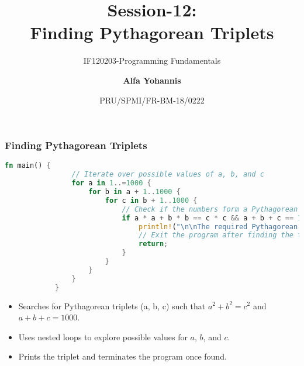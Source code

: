 \documentclass[aspectratio=169, table]{beamer}
\subtitle{IF120203-Programming Fundamentals}
\title{Session-12:\\\LARGE{Finding Pythagorean Triplets}}
\date[Serial]{\scriptsize {PRU/SPMI/FR-BM-18/0222}}
\author[Pradita]{\small{\textbf{Alfa Yohannis}}}
\begin{document}
	
	\frame{\titlepage}
	
	\begin{frame}[fragile]
		\frametitle{Finding Pythagorean Triplets}
		\begin{lstlisting}[language=Rust]
			fn main() {
				// Iterate over possible values of a, b, and c
				for a in 1..=1000 {
					for b in a + 1..1000 {
						for c in b + 1..1000 {
							// Check if the numbers form a Pythagorean triplet and their sum is 1000
							if a * a + b * b == c * c && a + b + c == 1000 {
								println!("\n\nThe required Pythagorean triplet is ({}, {}, {})\n\n", a, b, c);
								// Exit the program after finding the triplet
								return;
							}
						}
					}
				}
			}
		\end{lstlisting}
		\begin{itemize}
			\item Searches for Pythagorean triplets (a, b, c) such that \(a^2 + b^2 = c^2\) and \(a + b + c = 1000\).
			\item Uses nested loops to explore possible values for \(a\), \(b\), and \(c\).
			\item Prints the triplet and terminates the program once found.
		\end{itemize}
	\end{frame}
	
\end{document}
